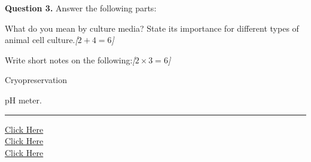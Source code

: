 \documentclass[11pt,a4paper]{article}
\newcommand{\pts}[1]{\hfill   \textit{[#1]}}
\begin{document}
\medskip


\noindent   \textbf{Question 3.} Answer the following parts:

\begin{parts}
  \item What do you mean by culture media? State its importance for different types of animal cell culture.\pts{$2 + 4 = 6$}
  \item Write short notes on the following:\pts{$2  \times 3 = 6$}
  
\begin{parts}
    \item Cryopreservation
    \item pH meter.
  \end{parts}
\end{parts}

\vfill
\rule{\linewidth}{0.4pt}

\begin{center}\small
\href{https://bhu-exam.vercel.app/}{Click Here}\\[4pt]\href{https://me-aryan.vercel.app/}{Click Here}\\[4pt]\href{https://quashan-me.vercel.app/}{Click Here}
\end{center}
\end{document}
